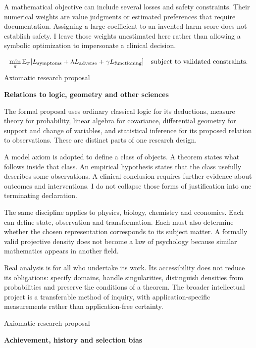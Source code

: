 \documentclass[10pt]{article}
\begin{document}
A mathematical objective can include several losses and safety constraints. Their numerical weights are value judgments or estimated preferences that require documentation. Assigning a large coefficient to an invented harm score does not establish safety. I leave those weights unestimated here rather than allowing a symbolic optimization to impersonate a clinical decision.\par
\[\min_\pi\mathbb E_\pi[L_{\rm symptoms}+\lambda L_{\rm adverse}+\gamma L_{\rm functioning}]\quad\text{subject to validated constraints.}\]
\clearpage
{\small\color{accent}Axiomatic research proposal}\par
{\LARGE\bfseries\color{ink}Relations to logic, geometry and other sciences}\par\vspace{7pt}
The formal proposal uses ordinary classical logic for its deductions, measure theory for probability, linear algebra for covariance, differential geometry for support and change of variables, and statistical inference for its proposed relation to observations. These are distinct parts of one research design.\par
A model axiom is adopted to define a class of objects. A theorem states what follows inside that class. An empirical hypothesis states that the class usefully describes some observations. A clinical conclusion requires further evidence about outcomes and interventions. I do not collapse those forms of justification into one terminating declaration.\par
The same discipline applies to physics, biology, chemistry and economics. Each can define state, observation and transformation. Each must also determine whether the chosen representation corresponds to its subject matter. A formally valid projective density does not become a law of psychology because similar mathematics appears in another field.\par
Real analysis is for all who undertake its work. Its accessibility does not reduce its obligations: specify domains, handle singularities, distinguish densities from probabilities and preserve the conditions of a theorem. The broader intellectual project is a transferable method of inquiry, with application-specific measurements rather than application-free certainty.\par
\clearpage
{\small\color{accent}Axiomatic research proposal}\par
{\LARGE\bfseries\color{ink}Achievement, history and selection bias}\par\vspace{7pt}
\end{document}
